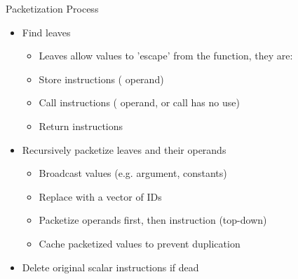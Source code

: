 
\begin{frame}{Packetization Process}

\begin{itemize}
    \item Find leaves
    \begin{itemize}
        \item Leaves allow  values to 'escape' from the function, they are:
        \item Store instructions ( operand)
        \item Call instructions ( operand, or call has no use)
        \item Return instructions
    \end{itemize}
\end{itemize}

\begin{itemize}
    \item Recursively packetize leaves and their operands
    \begin{itemize}
        \item Broadcast  values (e.g. argument, constants)
        \item Replace  with a vector of IDs
        \item Packetize operands first, then instruction (top-down)
        \item Cache packetized values to prevent duplication
    \end{itemize}
\end{itemize}

\begin{itemize}
    \item Delete original scalar instructions if dead
\end{itemize}

\end{frame}


